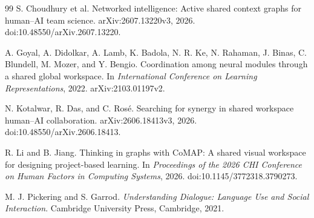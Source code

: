 \begin{thebibliography}{99}
S. Choudhury et al.
\newblock Networked intelligence: Active shared context graphs for human--AI team science.
\newblock arXiv:2607.13220v3, 2026.
\newblock doi:10.48550/arXiv.2607.13220.

A. Goyal, A. Didolkar, A. Lamb, K. Badola, N. R. Ke, N. Rahaman, J. Binas,
C. Blundell, M. Mozer, and Y. Bengio.
\newblock Coordination among neural modules through a shared global workspace.
\newblock In \emph{International Conference on Learning Representations}, 2022.
\newblock arXiv:2103.01197v2.

N. Kotalwar, R. Das, and C. Ros\'e.
\newblock Searching for synergy in shared workspace human--AI collaboration.
\newblock arXiv:2606.18413v3, 2026.
\newblock doi:10.48550/arXiv.2606.18413.

R. Li and B. Jiang.
\newblock Thinking in graphs with CoMAP: A shared visual workspace for designing project-based learning.
\newblock In \emph{Proceedings of the 2026 CHI Conference on Human Factors in Computing Systems}, 2026.
\newblock doi:10.1145/3772318.3790273.

M. J. Pickering and S. Garrod.
\newblock \emph{Understanding Dialogue: Language Use and Social Interaction}.
\newblock Cambridge University Press, Cambridge, 2021.

\end{thebibliography}

